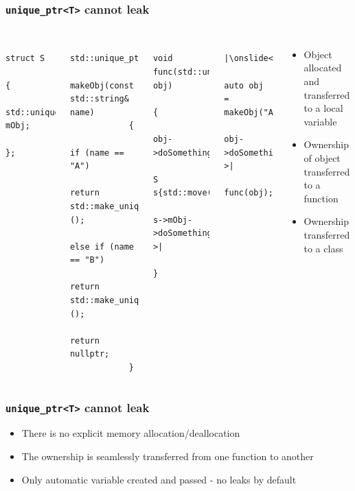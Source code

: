 \documentclass{beamer}
\begin{document}
\begin{frame}[fragile]
\frametitle{\texttt{unique\_ptr<T>} cannot leak}
	\begin{columns}[t]
		\begin{lstlisting}
			struct S
			{
				std::unique_ptr<MyClass> mObj;
			};
		\end{lstlisting}
		
		\begin{lstlisting}
			std::unique_ptr<MyClass> 
			makeObj(const std::string& name)
			{
				if (name == "A")
					return std::make_unique<MyDerivedClassA>();
				else if (name == "B")
					return std::make_unique<MyDerivedClassB>();
				return nullptr;
			}
		\end{lstlisting}
		
		\begin{lstlisting}	
			void func(std::unique_ptr<MyClass> obj)
			{
				obj->doSomething();|\onslide<3>|
				S s{std::move(obj}; 
				s->mObj->doSomething()|\onslide<2->|
			}
		\end{lstlisting}
		
        \hrulefill
		\begin{lstlisting}
			|\onslide<1>|	
			auto obj = makeObj("A");
			obj->doSomething();|\onslide<2->|
			func(obj);	
		\end{lstlisting}
		\begin{itemize}
			\item<1> Object allocated and transferred to a local variable
			\item<2> Ownership of object transferred to a function
			\item<3> Ownership transferred to a class
		\end{itemize}
	\end{columns}
\end{frame}

\begin{frame}[fragile]
\frametitle{\texttt{unique\_ptr<T>} cannot leak}
	\begin{itemize}
		\item There is no explicit memory allocation/deallocation
		\item The ownership is seamlessly transferred from one function to another
		\item Only automatic variable created and passed - no leaks by default
	\end{itemize}
\end{frame}
\end{document}

